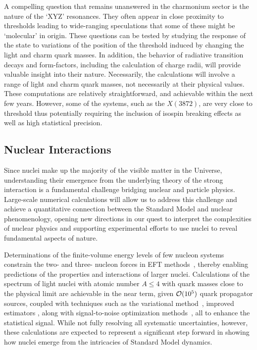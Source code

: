 A compelling question that remains unanswered in the charmonium sector is the nature of the `XYZ' resonances. They often appear in close proximity to thresholds leading to wide-ranging speculations that some of these might be `molecular' in origin. These questions can be tested by studying the response of the state to variations of the position of the threshold induced by changing the light and charm quark masses. In addition, the behavior of radiative transition decays and form-factors, including the calculation of charge radii, will provide valuable insight into their nature. Necessarily, the calculations will involve a range of light and charm quark masses, not necessarily at their physical values.  These computations are relatively straightforward, and achievable within the next few years. However, some of the systems, such as the $X(3872)$, are very close to threshold thus potentially requiring the inclusion of isospin breaking effects as well as high statistical precision.


\subsection{Nuclear Interactions}

Since nuclei make up the majority of the visible matter in the Universe, understanding their emergence from the underlying theory of the strong interaction is a fundamental challenge bridging nuclear and particle physics. Large-scale numerical calculations will allow us to address this challenge and achieve a quantitative connection between the Standard Model and nuclear phenomenology, opening new directions in our quest to interpret the complexities of nuclear physics and supporting experimental efforts to use nuclei to reveal fundamental aspects of nature.

Determinations of the finite-volume energy levels of few nucleon systems constrain the two- and three- nucleon forces in EFT methods~\cite{Barnea:2013uqa}, thereby enabling predictions of the properties and interactions of larger nuclei. Calculations of the spectrum of light nuclei with atomic number $A\le 4$ with quark masses close to the physical limit are achievable in the near term, given ${\cal O}(10^5)$ quark propagator sources, coupled with techniques such as the variational method~\cite{Michael:1985ne}, improved estimators \cite{Beane:2014oea}, along with signal-to-noise optimization methods~\cite{Detmold:2014hla}, all to enhance the statistical signal. While not fully resolving all systematic uncertainties, however, these calculations are expected to represent a significant step forward in showing how nuclei emerge from the intricacies of Standard Model dynamics.

